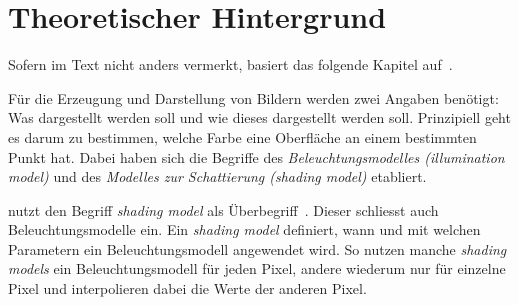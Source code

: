 
\chapter{Theoretischer Hintergrund}
\label{chap:theoretical_background}

Sofern im Text nicht anders vermerkt, basiert das folgende Kapitel
auf~\cite[S. 721ff]{foley_computer_1996}.

Für die Erzeugung und Darstellung von Bildern werden zwei Angaben
benötigt: Was dargestellt werden soll und wie dieses dargestellt werden
soll.
Prinzipiell geht es darum zu bestimmen, welche Farbe eine Oberfläche an
einem bestimmten Punkt hat. Dabei haben sich die Begriffe des
\textit{Beleuchtungsmodelles (illumination model)} und des
\textit{Modelles zur Schattierung (shading model)} etabliert.

\citeauthor{foley_computer_1996} nutzt den Begriff \textit{shading
model} als Überbegriff~\parencite[S. 721]{foley_computer_1996}. Dieser
schliesst auch Beleuchtungsmodelle ein.  Ein \textit{shading model}
definiert, wann und mit welchen Parametern ein Beleuchtungsmodell
angewendet wird. So nutzen manche \textit{shading models} ein
Beleuchtungsmodell für jeden Pixel, andere wiederum nur für einzelne
Pixel und interpolieren dabei die Werte der anderen Pixel.



